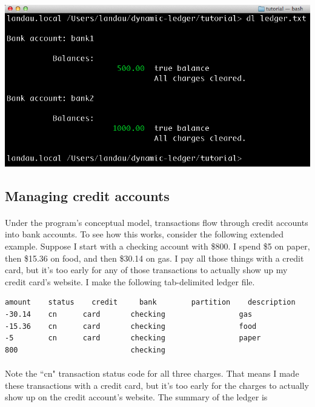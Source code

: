 \documentclass{article}
\providecommand{\q}{$\quad$ \newline}
\begin{document}
\begin{flushleft}
\begin{center}
\includegraphics[scale=.45]{fig/sum2.png}
\end{center}  





\subsection{Managing credit accounts}

\paragraph{} Under the program's conceptual model, transactions flow through credit accounts into bank accounts. To see how this works, consider the following extended example. Suppose I start with a checking account with \$800. I spend \$5 on paper, then \$15.36 on food, and then \$30.14 on gas. I pay all those things with a credit card, but it's too early for any of those transactions to actually show up my credit card's website. I make the following tab-delimited ledger file.

\begin{lstlisting}[title=ledger.txt]
amount    status	credit     bank        partition    description
-30.14    cn      card       checking                 gas
-15.36    cn      card       checking                 food
-5        cn      card       checking                 paper
800                          checking
\end{lstlisting}

\paragraph{} Note the ``cn" transaction status code for all three charges. That means I made these transactions with a credit card, but it's too early for the charges to actually show up on the credit account's website. The summary of the ledger is \q


\end{flushleft}
\end{document}
